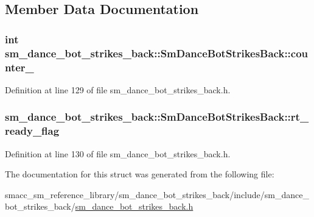 \subsection{Member Data Documentation}
\subsubsection[{\texorpdfstring{counter\+\_\+1}{counter_1}}]{\setlength{\rightskip}{0pt plus 5cm}int sm\+\_\+dance\+\_\+bot\+\_\+strikes\+\_\+back\+::\+Sm\+Dance\+Bot\+Strikes\+Back\+::counter\+\_}\hypertarget{structsm__dance__bot__strikes__back_1_1SmDanceBotStrikesBack_a0cf56e316022dde4b3da552ab9f68513}{}\label{structsm__dance__bot__strikes__back_1_1SmDanceBotStrikesBack_a0cf56e316022dde4b3da552ab9f68513}


Definition at line 129 of file sm\+\_\+dance\+\_\+bot\+\_\+strikes\+\_\+back.\+h.

\subsubsection[{\texorpdfstring{rt\+\_\+ready\+\_\+flag}{rt_ready_flag}}]{ sm\+\_\+dance\+\_\+bot\+\_\+strikes\+\_\+back\+::\+Sm\+Dance\+Bot\+Strikes\+Back\+::rt\+\_\+ready\+\_\+flag}\hypertarget{structsm__dance__bot__strikes__back_1_1SmDanceBotStrikesBack_a609265a94c2575580fbb014f551a066a}{}\label{structsm__dance__bot__strikes__back_1_1SmDanceBotStrikesBack_a609265a94c2575580fbb014f551a066a}


Definition at line 130 of file sm\+\_\+dance\+\_\+bot\+\_\+strikes\+\_\+back.\+h.



The documentation for this struct was generated from the following file\+:\begin{DoxyCompactItemize}
\item 
smacc\+\_\+sm\+\_\+reference\+\_\+library/sm\+\_\+dance\+\_\+bot\+\_\+strikes\+\_\+back/include/sm\+\_\+dance\+\_\+bot\+\_\+strikes\+\_\+back/\hyperlink{sm__dance__bot__strikes__back_8h}{sm\+\_\+dance\+\_\+bot\+\_\+strikes\+\_\+back.\+h}\end{DoxyCompactItemize}
